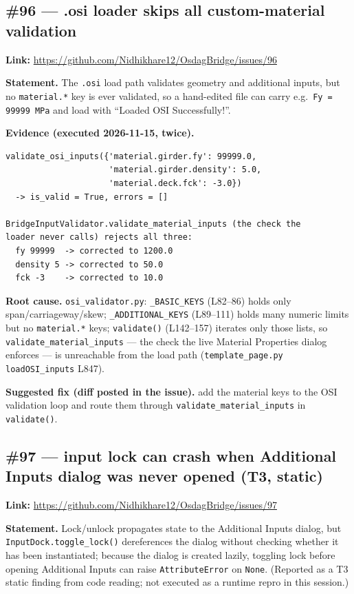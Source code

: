 \subsection{\#96 --- .osi loader skips all custom-material validation}
\textbf{Link:} \url{https://github.com/Nidhikhare12/OsdagBridge/issues/96}

\textbf{Statement.} The \texttt{.osi} load path validates geometry and additional inputs, but no \texttt{material.*} key is ever validated, so a hand-edited file can carry e.g.\ \texttt{Fy\,=\,99999\,MPa} and load with ``Loaded OSI Successfully!''.

\textbf{Evidence (executed 2026-11-15, twice).}
\begin{verbatim}
validate_osi_inputs({'material.girder.fy': 99999.0,
                     'material.girder.density': 5.0,
                     'material.deck.fck': -3.0})
  -> is_valid = True, errors = []

BridgeInputValidator.validate_material_inputs (the check the
loader never calls) rejects all three:
  fy 99999  -> corrected to 1200.0
  density 5 -> corrected to 50.0
  fck -3    -> corrected to 10.0
\end{verbatim}

\textbf{Root cause.} \texttt{osi\_validator.py}: \texttt{\_BASIC\_KEYS} (L82--86) holds only span/carriageway/skew; \texttt{\_ADDITIONAL\_KEYS} (L89--111) holds many numeric limits but no \texttt{material.*} keys; \texttt{validate()} (L142--157) iterates only those lists, so \texttt{validate\_material\_inputs} --- the check the live Material Properties dialog enforces --- is unreachable from the load path (\texttt{template\_page.py} \texttt{loadOSI\_inputs} L847).

\textbf{Suggested fix (diff posted in the issue).} add the material keys to the OSI validation loop and route them through \texttt{validate\_material\_inputs} in \texttt{validate()}.

\subsection{\#97 --- input lock can crash when Additional Inputs dialog was never opened (T3, static)}
\textbf{Link:} \url{https://github.com/Nidhikhare12/OsdagBridge/issues/97}

\textbf{Statement.} Lock/unlock propagates state to the Additional Inputs dialog, but \texttt{InputDock.toggle\_lock()} dereferences the dialog without checking whether it has been instantiated; because the dialog is created lazily, toggling lock before opening Additional Inputs can raise \texttt{AttributeError} on \texttt{None}. (Reported as a T3 static finding from code reading; not executed as a runtime repro in this session.)

